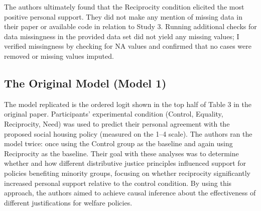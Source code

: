 \documentclass{article}
\begin{document}
The authors ultimately found that the Reciprocity condition elicited the most positive personal support. They did not make any mention of missing data in their paper or available code in relation to Study 3. Running additional checks for data missingness in the provided data set did not yield any missing values; I verified missingness by checking for NA values and confirmed that no cases were removed or missing values imputed.

\subsection{The Original Model (Model 1)}

The model replicated is the ordered logit shown in the top half of Table 3 in the original paper. Participants' experimental condition (Control, Equality, Reciprocity, Need) was used to predict their personal agreement with the proposed social housing policy (measured on the 1–4 scale). The authors ran the model twice: once using the Control group as the baseline and again using Reciprocity as the baseline. Their goal with these analyses was to determine whether and how different distributive justice principles influenced support for policies benefiting minority groups, focusing on whether reciprocity significantly increased personal support relative to the control condition. By using this approach, the authors aimed to achieve causal inference about the effectiveness of different justifications for welfare policies.
\end{document}

